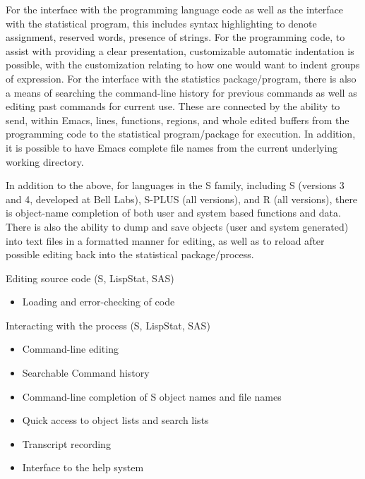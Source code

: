 \documentclass{article}
\begin{document}
For the interface with the programming language code as well as the
interface with the statistical program, this includes syntax
highlighting to denote assignment, reserved words, presence of
strings.  For the programming code, to assist with providing a clear
presentation, customizable automatic indentation is possible, with the
customization relating to how one would want to indent groups of
expression.  For the interface with the statistics package/program,
there is also a means of searching the command-line history for
previous commands as well as editing past commands for current use.
These are connected by the ability to send, within Emacs, lines,
functions, regions, and whole edited buffers from the programming code
to the statistical program/package for execution.  In addition, it is
possible to have Emacs complete file names from the current underlying
working directory.

In addition to the above, for languages in the S family, including S
(versions 3 and 4, developed at Bell Labs), S-PLUS (all versions), and
R (all versions), there is object-name completion of both user and
system based functions and data.  There is also the ability to dump
and save objects (user and system generated) into text files in a
formatted manner for editing, as well as to reload after possible
editing back into the statistical package/process.

Editing source code (S, LispStat, SAS)
\begin{itemize}
\item Loading and error-checking of code
\end{itemize}

Interacting with the process (S, LispStat, SAS)
\begin{itemize}
\item Command-line editing
\item Searchable Command history
\item Command-line completion of S object names and file names
\item Quick access to object lists and search lists
\item Transcript recording
\item Interface to the help system
\end{itemize}
\end{document}
